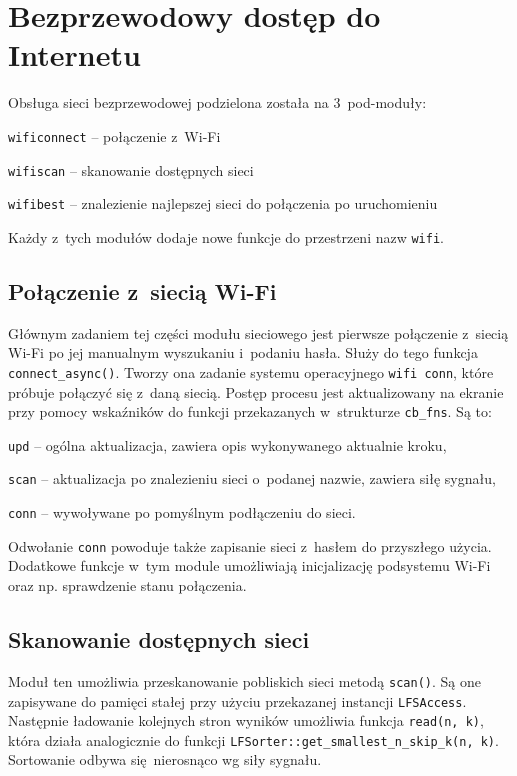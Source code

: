 \documentclass[polish]{aghengthesis}
\let\tempone\itemize
\let\temptwo\enditemize
\renewenvironment{itemize}{\tempone\setlength{\itemsep}{0cm}}{\temptwo}
\begin{document}
	\section{Bezprzewodowy dostęp do Internetu}
		Obsługa sieci bezprzewodowej podzielona została na 3~pod-moduły:
		\begin{itemize}
			\item \lstinline|wificonnect| -- połączenie z~Wi-Fi
			\item \lstinline|wifiscan| -- skanowanie dostępnych sieci
			\item \lstinline|wifibest| -- znalezienie najlepszej sieci do połączenia po uruchomieniu
		\end{itemize}
		
		Każdy z~tych modułów dodaje nowe funkcje do przestrzeni nazw \lstinline|wifi|.
		
		\subsection{Połączenie z~siecią Wi-Fi}
			Głównym zadaniem tej części modułu sieciowego jest pierwsze połączenie z~siecią Wi-Fi po jej manualnym wyszukaniu i~podaniu hasła. Służy do tego funkcja \lstinline|connect_async()|. Tworzy ona zadanie systemu operacyjnego \lstinline|wifi conn|, które próbuje połączyć się z~daną siecią. Postęp procesu jest aktualizowany na ekranie przy pomocy wskaźników do funkcji przekazanych w~strukturze \lstinline|cb_fns|. Są to:
			\begin{itemize}
				\item \lstinline|upd| -- ogólna aktualizacja, zawiera opis wykonywanego aktualnie kroku,
				\item \lstinline|scan| -- aktualizacja po znalezieniu sieci o~podanej nazwie, zawiera siłę sygnału,
				\item \lstinline|conn| -- wywoływane po pomyślnym podłączeniu do sieci.
			\end{itemize}
			
			Odwołanie \lstinline|conn| powoduje także zapisanie sieci z~hasłem do przyszłego użycia. Dodatkowe funkcje w~tym module umożliwiają inicjalizację podsystemu Wi-Fi oraz np. sprawdzenie stanu połączenia.
			
		\subsection{Skanowanie dostępnych sieci}
			Moduł ten umożliwia przeskanowanie pobliskich sieci metodą \lstinline|scan()|. Są one zapisywane do pamięci stałej przy użyciu przekazanej instancji \lstinline|LFSAccess|. Następnie ładowanie kolejnych stron wyników umożliwia funkcja \lstinline|read(n, k)|, która działa analogicznie do funkcji \lstinline|LFSorter::get_smallest_n_skip_k(n, k)|. Sortowanie odbywa się nierosnąco wg siły sygnału.
			
\end{document}
